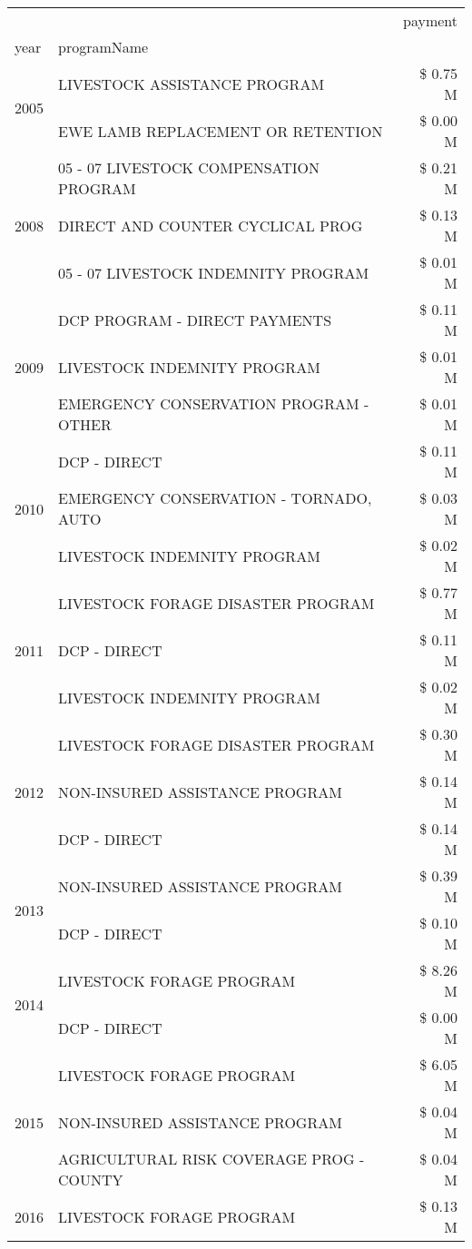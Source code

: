 \begin{tabular}{llr}
\toprule
 &  & payment \\
year & programName &  \\
\midrule
\multirow[t]{2}{*}{2005} & LIVESTOCK ASSISTANCE PROGRAM & \$ 0.75 M \\
 & EWE LAMB REPLACEMENT OR RETENTION & \$ 0.00 M \\
\cline{1-3}
\multirow[t]{3}{*}{2008} & 05 - 07 LIVESTOCK COMPENSATION PROGRAM & \$ 0.21 M \\
 & DIRECT AND COUNTER CYCLICAL PROG & \$ 0.13 M \\
 & 05 - 07 LIVESTOCK INDEMNITY PROGRAM & \$ 0.01 M \\
\cline{1-3}
\multirow[t]{3}{*}{2009} & DCP PROGRAM - DIRECT PAYMENTS & \$ 0.11 M \\
 & LIVESTOCK INDEMNITY PROGRAM & \$ 0.01 M \\
 & EMERGENCY CONSERVATION PROGRAM - OTHER & \$ 0.01 M \\
\cline{1-3}
\multirow[t]{3}{*}{2010} & DCP - DIRECT & \$ 0.11 M \\
 & EMERGENCY CONSERVATION - TORNADO, AUTO & \$ 0.03 M \\
 & LIVESTOCK INDEMNITY PROGRAM & \$ 0.02 M \\
\cline{1-3}
\multirow[t]{3}{*}{2011} & LIVESTOCK FORAGE DISASTER PROGRAM & \$ 0.77 M \\
 & DCP - DIRECT & \$ 0.11 M \\
 & LIVESTOCK INDEMNITY PROGRAM & \$ 0.02 M \\
\cline{1-3}
\multirow[t]{3}{*}{2012} & LIVESTOCK FORAGE DISASTER PROGRAM & \$ 0.30 M \\
 & NON-INSURED ASSISTANCE PROGRAM & \$ 0.14 M \\
 & DCP - DIRECT & \$ 0.14 M \\
\cline{1-3}
\multirow[t]{2}{*}{2013} & NON-INSURED ASSISTANCE PROGRAM & \$ 0.39 M \\
 & DCP - DIRECT & \$ 0.10 M \\
\cline{1-3}
\multirow[t]{2}{*}{2014} & LIVESTOCK FORAGE PROGRAM & \$ 8.26 M \\
 & DCP - DIRECT & \$ 0.00 M \\
\cline{1-3}
\multirow[t]{3}{*}{2015} & LIVESTOCK FORAGE PROGRAM & \$ 6.05 M \\
 & NON-INSURED ASSISTANCE PROGRAM & \$ 0.04 M \\
 & AGRICULTURAL RISK COVERAGE PROG - COUNTY & \$ 0.04 M \\
\cline{1-3}
\multirow[t]{3}{*}{2016} & LIVESTOCK FORAGE PROGRAM & \$ 0.13 M \\

\end{tabular}
